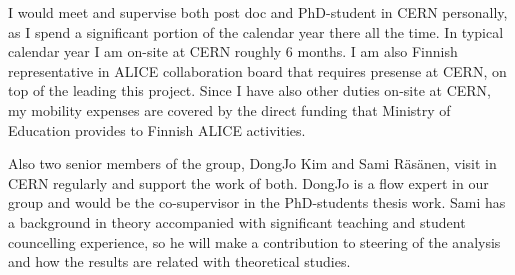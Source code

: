 I would meet and supervise both post doc and PhD-student in CERN personally, as I spend a significant portion of the calendar year there all the time. In typical calendar year I am on-site at CERN roughly 6 months. I am also Finnish representative in ALICE collaboration board that requires presense at CERN, on top of the leading this project. Since I have also other duties on-site at CERN, my mobility expenses are covered by the direct funding that Ministry of Education provides to Finnish ALICE activities.

Also two senior members of the group, DongJo Kim and Sami R\"as\"anen, visit in CERN regularly and support the work of both. DongJo is a flow expert in our group and would be the co-supervisor in the PhD-students thesis work. Sami has a background in theory accompanied with significant teaching and student councelling experience, so he will make a contribution to steering of the analysis and how the results are related with theoretical studies.


\nopagebreak
